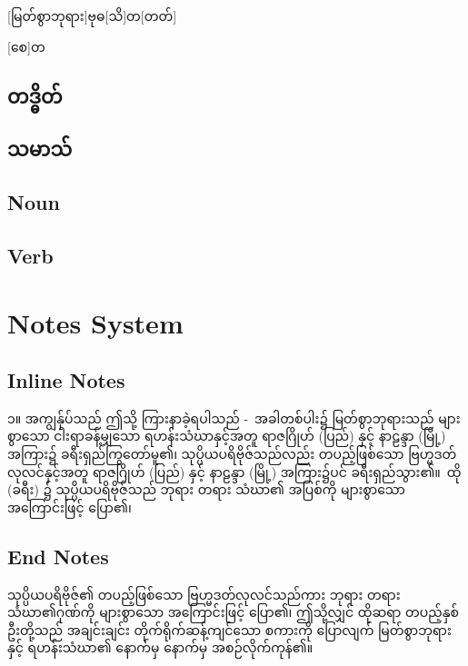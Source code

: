 [မြတ်စွာဘုရား]{ဗုဓ}[သိ]{တ}[တတ်]

\kitafull{}{}{}{}


\kitafull*{}{}{}{}

[စေ]{တ}

\subsection{တဒ္ဓိတ်}
\taddhita{}{}{}

\subsection{သမာသ်}
\samasa{}{}{}

\subsection{Noun}

\subsection{Verb}


\section{Notes System}
\subsection{Inline Notes}
၁။ အကျွန်ုပ်သည် ဤသို့ ကြားနာခဲ့ရပါသည် - အခါတစ်ပါး၌ မြတ်စွာဘုရားသည် များစွာသော ငါးရာခန့်မျှသော ရဟန်းသံဃာနှင့်အတူ ရာဇဂြိုဟ် (ပြည်) နှင့် နာဠန္ဒာ (မြို့) အကြား၌ ခရီးရှည်ကြွတော်မူ၏၊ သုပ္ပိယပရိဗိုဇ်သည်လည်း တပည့်ဖြစ်သော ဗြဟ္မဒတ်လုလင်နှင့်အတူ ရာဇဂြိုဟ် (ပြည်) နှင့် နာဠန္ဒာ (မြို့) အကြား၌ပင် ခရီးရှည်သွား၏။ ထို (ခရီး) ၌ သုပ္ပိယပရိဗိုဇ်သည် ဘုရား တရား သံဃာ၏ အပြစ်ကို များစွာသော အကြောင်းဖြင့် ပြော၏၊ 

\subsection{End Notes}
သုပ္ပိယပရိဗိုဇ်၏ တပည့်ဖြစ်သော ဗြဟ္မဒတ်လုလင်သည်ကား ဘုရား တရား သံဃာ၏ဂုဏ်ကို များစွာသော အကြောင်းဖြင့် ပြော၏၊ ဤသို့လျှင် ထိုဆရာ တပည့်နှစ်ဦးတို့သည် အချင်းချင်း တိုက်ရိုက်ဆန့်ကျင်သော စကားကို ပြောလျက် မြတ်စွာဘုရားနှင့် ရဟန်းသံဃာ၏ နောက်မှ နောက်မှ အစဉ်လိုက်ကုန်၏။

